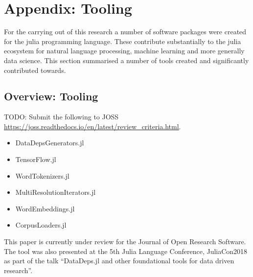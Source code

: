 \documentclass{book}
\begin{document}
	\part{Appendix: Tooling}
	For the carrying out of this research a number of software packages were created for the julia programming language.
	These contribute substantially to the julia ecosystem for natural language processing, machine learning and more generally data science.
	This section summarised a number of tools created and significantly contributed towards.
	
	\chapter{Overview: Tooling}
	TODO: Submit the following to JOSS	\url{https://joss.readthedocs.io/en/latest/review_criteria.html}.
	
	\begin{itemize}
		\item DataDepsGenerators.jl
		\item TensorFlow.jl
		\item WordTokenizers.jl
		\item MultiResolutionIterators.jl
		\item WordEmbeddings.jl
		\item CorpusLoaders.jl
	\end{itemize}
	
	
	\begin{preamble}
		This paper is currently under review for the Journal of Open Research Software.
		The tool was also presented at the 5th Julia Language Conference, JuliaCon2018
		as part of the talk ``DataDeps.jl and other foundational tools for data driven research''.
	\end{preamble}
	
\end{document}
